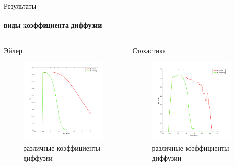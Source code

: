 \documentclass[8pt,pdf,hyperref={unicode},serif]{beamer}
\begin{document}
\begin{frame}{Результаты}
\framesubtitle{виды коэффициента диффузии}
\begin{columns}
\begin{column}{0.5\textwidth}
Эйлер
\begin{figure}[H]
\centering
\includegraphics[width=0.90\linewidth]{r_bom_or_not2}
\caption{различные коэффициенты диффузии}
\end{figure}
\end{column}

\begin{column}{0.5\textwidth}
Стохастика
\begin{figure}[H]
\centering
\includegraphics[width=0.90\linewidth]{stoh_bom_or_not}
\caption{различные коэффициенты диффузии}
\end{figure}
\end{column}
\end{columns}
\end{frame}
\end{document}
